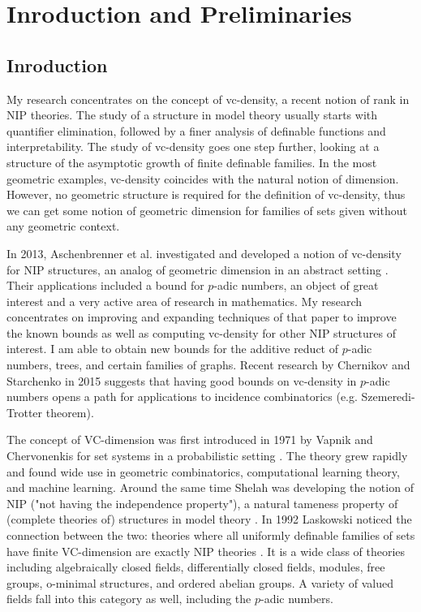 \chapter{Inroduction and Preliminaries}

\section{Inroduction}

My research concentrates on the concept of vc-density, a recent notion of rank in NIP theories.
The study of a structure in model theory usually starts with quantifier elimination, followed by a finer analysis of definable functions and interpretability.
The study of vc-density goes one step further, looking at a structure of the asymptotic growth of finite definable families.
In the most geometric examples, vc-density coincides with the natural notion of dimension.
However, no geometric structure is required for the definition of vc-density, thus we can get some notion of geometric dimension for families of sets given without any geometric context.

In 2013, Aschenbrenner et al. investigated and developed a notion of vc-density for NIP structures, an analog of geometric dimension in an abstract setting \cite{density}. Their applications included a bound for $p$-adic numbers, an object of great interest and a very active area of research in mathematics. My research concentrates on improving and expanding techniques of that paper to improve the known bounds as well as computing vc-density for other NIP structures of interest. I am able to obtain new bounds for the additive reduct of $p$-adic numbers, trees, and certain families of graphs. Recent research by Chernikov and Starchenko in 2015 \cite{regularity} suggests that having good bounds on vc-density in $p$-adic numbers opens a path for applications to incidence combinatorics (e.g. Szemeredi-Trotter theorem).

The concept of VC-dimension was first introduced in 1971 by Vapnik and Chervonenkis for set systems in a probabilistic setting \cite{vc71}.
The theory grew rapidly and found wide use in geometric combinatorics, computational learning theory, and machine learning.
Around the same time Shelah was developing the notion of NIP ("not having the independence property"),
a natural tameness property of (complete theories of) structures in model theory \cite{shelah_nip}.
In 1992 Laskowski noticed the connection between the two: theories where all uniformly definable families of sets have finite VC-dimension are exactly NIP theories \cite{laskowski92}.
It is a wide class of theories including algebraically closed fields, differentially closed fields, modules, free groups, o-minimal structures, and ordered abelian groups.
A variety of valued fields fall into this category as well, including the $p$-adic numbers.

